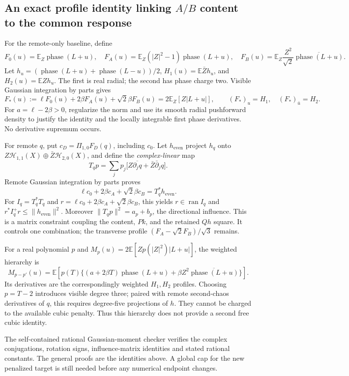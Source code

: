 \subsection{An exact profile identity linking $A/B$ content to the common response}
For the remote-only baseline, define
\[
 F_0(u)=\mathbb E_Z\operatorname{phase}(L+u),\quad
 F_A(u)=\mathbb E_Z(|Z|^2-1)\operatorname{phase}(L+u),\quad
 F_B(u)=\mathbb E_Z\frac{Z^2}{\sqrt2}
                         \overline{\operatorname{phase}(L+u)}.
\]
Let $h_u=(\operatorname{phase}(L+u)+\operatorname{phase}(L-u))/2$,
$H_1(u)=\mathbb E\bar Zh_u$, and $H_2(u)=\mathbb E Zh_u$.
The first is real radial; the second has phase charge two. Visible Gaussian
integration by parts gives
\[
 F_*(u):=\ell F_0(u)+2\beta F_A(u)+\sqrt2\beta F_B(u)
       =2\mathbb E_Z[Z|L+u|],\qquad
 (F_*)_u=H_1,\quad(F_*)_{\bar u}=H_2.
\]
For $a=\ell-2\beta>0$, regularize the norm and use its smooth radial
pushforward density to justify the identity and the locally integrable first
phase derivatives. No derivative supremum occurs.

For remote $q$, put $c_D=\Pi_{1,0}F_D(q)$, including $c_0$.
Let $h_{\mathrm{even}}$ project $h_q$ onto
$Z\mathcal H_{1,1}(X)\oplus\bar Z\mathcal H_{2,0}(X)$, and define the
\emph{complex-linear} map
\[
 T_qp=\sum_jp_j\bigl[Z\overline{\partial_jq}
                         +\bar Z\bar\partial_jq\bigr].
\]
Remote Gaussian integration by parts proves
\[
 \boxed{\ell c_0+2\beta c_A+\sqrt2\beta c_B=T_q^*h_{\mathrm{even}}.}
\]
For $I_q=T_q^*T_q$ and $r=\ell c_0+2\beta c_A+\sqrt2\beta c_B$, this yields
$r\in\operatorname{ran}I_q$ and
$r^*I_q^+r\le\|h_{\mathrm{even}}\|^2$.
Moreover $\|T_qp\|^2=a_p+b_p$, the directional influence. This is a matrix
constraint coupling the content, $Pk$, and the retained $Qh$ square.
It controls one combination; the transverse profile
$(F_A-\sqrt2F_B)/\sqrt3$ remains.

For a real polynomial $p$ and $M_p(u)=2\mathbb E[Zp(|Z|^2)|L+u|]$, the weighted
hierarchy is
\[
 M_{p-p'}(u)=\mathbb E\left[p(T)\{(a+2\beta T)\operatorname{phase}(L+u)
                  +\beta Z^2\overline{\operatorname{phase}(L+u)}\}\right].
\]
Its derivatives are the correspondingly weighted $H_1,H_2$ profiles.
Choosing $p=T-2$ introduces visible degree three; paired with remote
second-chaos derivatives of $q$, this requires degree-five projections of
$h$. They cannot be charged to the available cubic penalty. Thus this
hierarchy does not provide a second free cubic identity.

The self-contained rational Gaussian-moment checker verifies the complex
conjugations, rotation signs, influence-matrix identities and stated rational
constants. The general proofs are the identities above. A global cap for the
new penalized target is still needed before any numerical endpoint changes.

